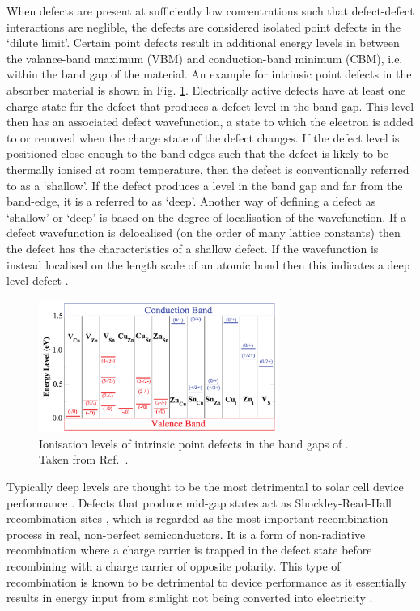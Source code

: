 \documentclass[11pt, twoside]{report}
\begin{document}
When defects are present at sufficiently low concentrations such that defect-defect interactions are neglible, the defects are considered isolated point defects in the `dilute limit'. Certain point defects result in additional energy levels in between the valance-band maximum (VBM) and conduction-band minimum (CBM), i.e. within the band gap of the material. An example for intrinsic point defects in the absorber material {\CZTS} is shown in Fig. \ref{defects_CZTS}. Electrically active defects have at least one charge state for the defect that produces a defect level in the band gap. This level then has an associated defect wavefunction, a state to which the electron is added to or removed when the charge state of the defect changes. If the defect level is positioned close enough to the band edges such that the defect is likely to be thermally ionised at room temperature, then the defect is conventionally referred to as a `shallow'. If the defect produces a level in the band gap and far from the band-edge, it is a referred to as `deep'.  Another way of defining a defect as `shallow' or `deep' is based on the degree of localisation of the wavefunction. If a defect wavefunction is delocalised (on the order of many lattice constants) then the defect has the characteristics of a shallow defect. If the wavefunction is instead localised on the length scale of an atomic bond then this indicates a deep level defect \cite{defects_tutorial}. 

\begin{figure}[h!]
  \centering
    \includegraphics[width=0.7\textwidth]{figures/Chen_CZTS_defects.png}
    \caption[Ionisation levels of intrinsic point defects in the band gaps of {\CZTS}]{Ionisation levels of intrinsic point defects in the band gaps of {\CZTS}. Taken from Ref.~.}
  \label{defects_CZTS}
\end{figure}

Typically deep levels are thought to be the most detrimental to solar cell device performance \cite{Stoneham_killer_defects}. 
Defects that produce mid-gap states act as Shockley-Read-Hall recombination sites \cite{SRH}, which is regarded as the most important recombination process in real, non-perfect semiconductors. It is a form of non-radiative recombination where a charge carrier is trapped in the defect state before recombining with a charge carrier of opposite polarity. This type of recombination is known to be detrimental to device performance as it essentially results in energy input from sunlight not being converted into electricity \cite{Nelson4}.
\end{document}
